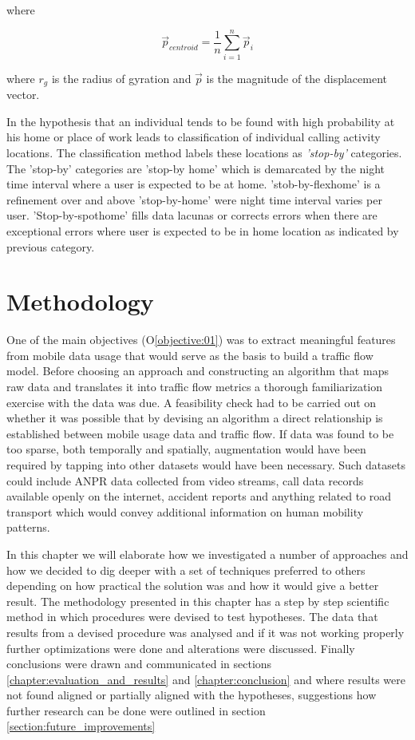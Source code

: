 \documentclass[12pt, a4paper]{report}
\theoremstyle{definition}
\theoremstyle{definition}%
\theoremstyle{definition}%
\theoremstyle{definition}%
\theoremstyle{definition}%
\theoremstyle{definition}%
\begin{document}
where 

\begin{equation}
{\stackrel{\to }{p}}_{centroid} = \frac{1}{n}\sum _{i=1}^{n}{\stackrel{\to }{p}}_{i}
\end{equation}

where $r_{g}$ is the radius of gyration and ${\stackrel{\to }{p}}$ is the magnitude of the displacement vector.   

In \cite{Hoteit2016} the hypothesis that an individual tends to be found with high probability at his home or place of work leads to classification of individual calling activity locations. The classification method labels these locations as \textit{'stop-by'} categories. The 'stop-by' categories are 'stop-by home' which is demarcated by the night time interval where a user is expected to be at home. 'stob-by-flexhome' is a refinement over and above 'stop-by-home' were night time interval varies per user. 'Stop-by-spothome' fills data lacunas or corrects errors when there are exceptional errors where user is expected to be in home location as indicated by previous category.



\chapter{Methodology} \label{chapter:methodology}

One of the main objectives (O\ref{objective:01}) was to extract meaningful features from mobile data usage that would serve as the basis to build a traffic flow model. Before choosing an approach and constructing an algorithm that maps raw data and translates it into traffic flow metrics a thorough familiarization exercise with the data was due. A feasibility check had to be carried out on whether it was possible that by devising an algorithm a direct relationship is established between mobile usage data and traffic flow. If data was found to be too sparse, both temporally and spatially,  augmentation would have been required by tapping into other datasets would have been necessary. Such  datasets could include ANPR data collected from video streams, call data records available openly on the internet, accident reports and anything related to road transport which would convey additional information on human mobility patterns. 

In this chapter we will elaborate how we investigated a number of approaches and how we decided to dig deeper with a set of techniques preferred to others depending on how practical the solution was and how it would give a better result. The methodology presented in this chapter has a step by step scientific method in which procedures were devised to test hypotheses. The data that results from a devised procedure was analysed and if it was not working properly further optimizations were done and alterations were discussed. Finally conclusions were drawn and communicated in sections \ref{chapter:evaluation_and_results} and \ref{chapter:conclusion}  and where results were not found aligned or partially aligned with the hypotheses, suggestions how further research can be done were outlined in section \ref{section:future_improvements} 
\end{document}
